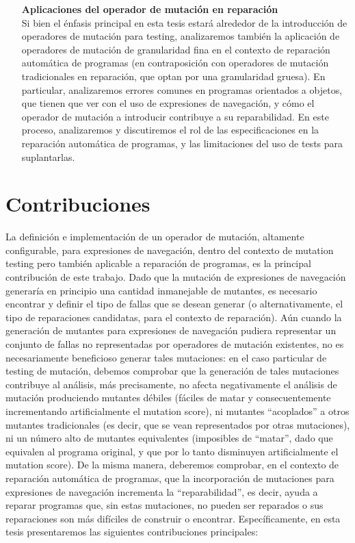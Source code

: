 \begin{enumerate}[leftmargin=.75cm,align=left,style=nextline]
    \item[\textbf{Aplicaciones del operador de mutaci\'on en reparaci\'on}]\mbox{}\\
	Si bien el \'enfasis principal en esta tesis estar\'a alrededor de la introducci\'on de operadores de mutaci\'on para testing, analizaremos tambi\'en la aplicaci\'on de operadores de mutaci\'on de granularidad fina en el contexto de reparaci\'on autom\'atica de programas (en contraposici\'on con operadores de mutaci\'on tradicionales en reparaci\'on, que optan por una granularidad gruesa). En particular, analizaremos errores comunes en programas orientados a objetos, que tienen que ver con el uso de expresiones de navegaci\'on, y c\'omo el operador de mutaci\'on a introducir contribuye a su reparabilidad. En este proceso, analizaremos y discutiremos el rol de las especificaciones en la reparaci\'on autom\'atica de programas, y las limitaciones del uso de tests para suplantarlas. 
\end{enumerate}


\section{Contribuciones}
\label{sec:intro.contribuciones}


La definici\'on e implementaci\'on de un operador de mutaci\'on, altamente configurable, para expresiones de navegaci\'on, dentro del contexto de mutation testing pero tambi\'en aplicable a reparaci\'on de programas, es la principal contribuci\'on de este trabajo. Dado que la mutaci\'on de expresiones de navegaci\'on generar\'ia en principio una cantidad inmanejable de mutantes, es necesario encontrar y definir el tipo de fallas que se desean generar (o alternativamente, el tipo de reparaciones candidatas, para el contexto de reparaci\'on). A\'un cuando la generaci\'on de mutantes para expresiones de navegaci\'on pudiera representar un conjunto de fallas no representadas por operadores de mutaci\'on existentes, no es necesariamente beneficioso generar tales mutaciones: en el caso particular de testing de mutaci\'on, debemos comprobar que la generaci\'on de tales mutaciones contribuye al an\'alisis, m\'as precisamente, no afecta negativamente el an\'alisis de mutaci\'on produciendo mutantes d\'ebiles (f\'aciles de matar y consecuentemente incrementando artificialmente el mutation score), ni mutantes ``acoplados'' a otros mutantes tradicionales (es decir, que se vean representados por otras mutaciones), ni un n\'umero alto de mutantes equivalentes (imposibles de ``matar'', dado que equivalen al programa original, y que por lo tanto disminuyen artificialmente el mutation score). De la misma manera, deberemos comprobar, en el contexto de reparaci\'on autom\'atica de programas, que la incorporaci\'on de mutaciones para expresiones de navegaci\'on incrementa la ``reparabilidad'', es decir, ayuda a reparar programas que, sin estas mutaciones, no pueden ser reparados o sus reparaciones son m\'as dif\'iciles de construir o encontrar. Espec\'ificamente, en esta tesis presentaremos las siguientes contribuciones principales:

